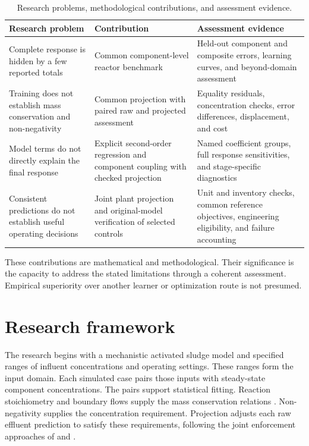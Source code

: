 \begin{table}[htbp]
\centering\small
\caption{Research problems, methodological contributions, and assessment evidence.}
\label{tab:introduction_contributions}
\begin{tabular}{p{}p{}p{}}
\toprule
Research problem & Contribution & Assessment evidence\\
\midrule
Complete response is hidden by a few reported totals & Common component-level reactor benchmark & Held-out component and composite errors, learning curves, and beyond-domain assessment\\
Training does not establish mass conservation and non-negativity & Common projection with paired raw and projected assessment & Equality residuals, concentration checks, error differences, displacement, and cost\\
Model terms do not directly explain the final response & Explicit second-order regression and component coupling with checked projection & Named coefficient groups, full response sensitivities, and stage-specific diagnostics\\
Consistent predictions do not establish useful operating decisions & Joint plant projection and original-model verification of selected controls & Unit and inventory checks, common reference objectives, engineering eligibility, and failure accounting\\
\bottomrule
\end{tabular}
\end{table}

These contributions are mathematical and methodological. Their significance is the capacity to address the stated limitations through a coherent assessment. Empirical superiority over another learner or optimization route is not presumed.

\section{Research framework}

The research begins with a mechanistic activated sludge model and specified ranges of influent concentrations and operating settings. These ranges form the input domain. Each simulated case pairs those inputs with steady-state component concentrations. The pairs support statistical fitting. Reaction stoichiometry and boundary flows supply the mass conservation relations \citep{Henze2006,SturmWexler2022}. Non-negativity supplies the concentration requirement. Projection adjusts each raw effluent prediction to satisfy these requirements, following the joint enforcement approaches of \citet{KircherVotsmeier2025} and \citet{Selerio2026}.

